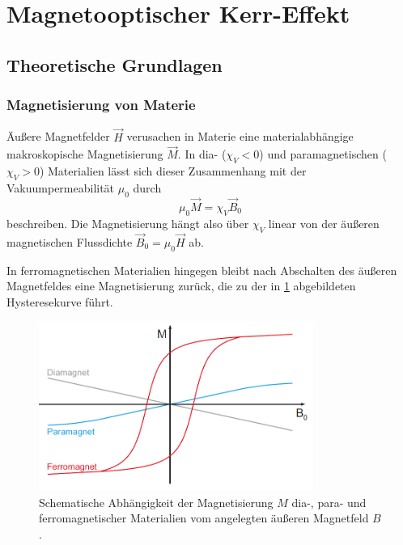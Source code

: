 \section{Magnetooptischer Kerr-Effekt}

\subsection{Theoretische Grundlagen}

  \subsubsection{Magnetisierung von Materie}

  Äußere Magnetfelder $\vec{H}$ verusachen in Materie eine materialabhängige makroskopische Magnetisierung $\vec{M}$.
  In dia- ($\chi_V<0$) und paramagnetischen ($\chi_V>0$) Materialien lässt sich dieser Zusammenhang mit der Vakuumpermeabilität $\mu_0$ durch
  \begin{equation}
    \mu_0 \vec{M} = \chi_V \vec{B}_0
  \end{equation}
  beschreiben.
  Die Magnetisierung hängt also über $\chi_V$ linear von der äußeren magnetischen Flussdichte $\vec{B}_0= \mu_0 \vec{H}$ ab.

  In ferromagnetischen Materialien hingegen bleibt nach Abschalten des äußeren Magnetfeldes eine Magnetisierung zurück, die zu der in \cref{fig_magnetismen} abgebildeten Hysteresekurve führt.

  \begin{figure}[H]
      \centering
      \includegraphics[width=0.8\textwidth]{img/magnetismen}
      \caption{Schematische Abhängigkeit der Magnetisierung $M$ dia-, para- und ferromagnetischer Materialien vom angelegten äußeren Magnetfeld $B$. \cite{anleitung}}
      \label{fig_magnetismen}
  \end{figure}

